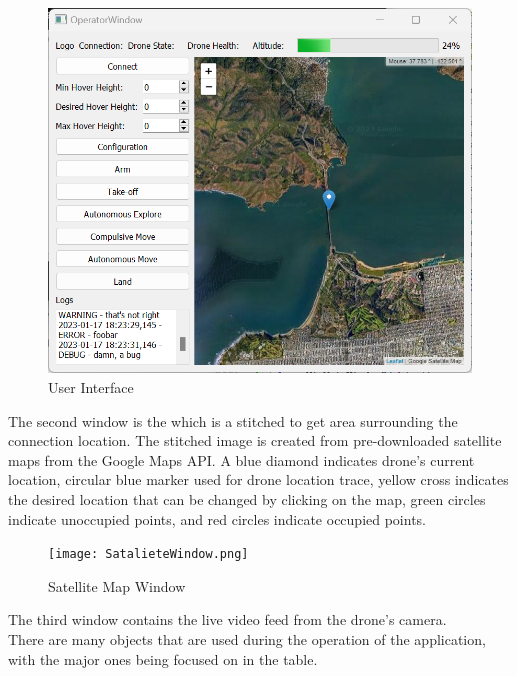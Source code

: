 \documentclass[12pt, titlepage]{article}
\begin{document}
\begin{figure}[h!]
  \begin{center} 
  \caption{User Interface}
  \label{UserInterface}
        \includegraphics[width=1\textwidth]{UserInterface.png}
  \end{center}
\end{figure}


The second window is the  which is a stitched to get area surrounding the connection location. The stitched image is created from pre-downloaded satellite maps from the Google Maps API. A blue diamond indicates drone’s current location, circular blue marker used for drone location trace, yellow cross indicates the desired location that can be changed by clicking on the map,
green circles indicate unoccupied points, and red circles indicate occupied points. \\

\begin{figure}[h!]
  \begin{center} 
  \caption{Satellite Map Window}
  \label{Satellite Map Window}
        \texttt{[image: SatalieteWindow.png]}
  \end{center}
\end{figure}


The third window contains the live video feed from the drone's camera. \\


There are many objects that are used during the operation of the application, with the major ones being focused on in the  table.
\end{document}
